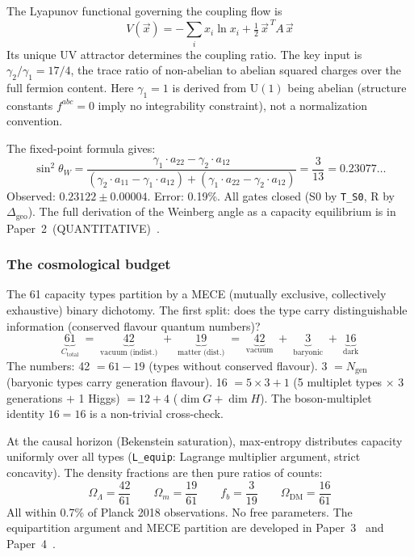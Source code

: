 \documentclass[11pt]{article}
\newcommand{\U}{\mathrm{U}}
\begin{document}
The Lyapunov functional governing the coupling flow is
\begin{equation}
V(\vec{x}) = -\sum_i x_i \ln x_i + \tfrac{1}{2}\, \vec{x}^{\,T} A\, \vec{x}
\end{equation}
Its unique UV attractor determines the coupling ratio.  The key input is $\gamma_2/\gamma_1 = 17/4$, the trace ratio of non-abelian to abelian squared charges over the full fermion content.  Here $\gamma_1 = 1$ is derived from $\U(1)$ being abelian (structure constants $f^{abc} = 0$ imply no integrability constraint), not a normalization convention.

The fixed-point formula gives:
\begin{equation}
\sin^2\!\theta_W = \frac{\gamma_1 \cdot a_{22} - \gamma_2 \cdot a_{12}}{(\gamma_2 \cdot a_{11} - \gamma_1 \cdot a_{12}) + (\gamma_1 \cdot a_{22} - \gamma_2 \cdot a_{12})} = \frac{3}{13} = 0.23077\ldots
\end{equation}
Observed: $0.23122 \pm 0.00004$.  Error: 0.19\%.  All gates closed (S0 by \texttt{T\_S0}, R by $\Delta_{\mathrm{geo}}$).  The full derivation of the Weinberg angle as a capacity equilibrium is in Paper~2~(QUANTITATIVE)~\cite{P2Q}.


\subsubsection{The cosmological budget}

The 61 capacity types partition by a MECE (mutually exclusive, collectively exhaustive) binary dichotomy.  The first split: does the type carry distinguishable information (conserved flavour quantum numbers)?
\begin{equation}
\underbrace{61}_{C_{\mathrm{total}}} \;=\; \underbrace{42}_{\text{vacuum (indist.)}} \;+\; \underbrace{19}_{\text{matter (dist.)}} \;=\; \underbrace{42}_{\text{vacuum}} \;+\; \underbrace{3}_{\text{baryonic}} \;+\; \underbrace{16}_{\text{dark}}
\end{equation}
The numbers: 42 $= 61 - 19$ (types without conserved flavour).  3 $= N_{\mathrm{gen}}$ (baryonic types carry generation flavour).  16 $= 5\times 3 + 1$ (5 multiplet types $\times$ 3 generations $+$ 1 Higgs) $= 12 + 4$ ($\dim G + \dim H$).  The boson-multiplet identity $16 = 16$ is a non-trivial cross-check.

At the causal horizon (Bekenstein saturation), max-entropy distributes capacity uniformly over all types (\texttt{L\_equip}: Lagrange multiplier argument, strict concavity).  The density fractions are then pure ratios of counts:
\begin{equation}
\Omega_\Lambda = \frac{42}{61} \qquad \Omega_m = \frac{19}{61} \qquad f_b = \frac{3}{19} \qquad \Omega_{\mathrm{DM}} = \frac{16}{61}
\end{equation}
All within 0.7\% of Planck 2018 observations.  No free parameters.  The equipartition argument and MECE partition are developed in Paper~3~\cite{P3} and Paper~4~\cite{P4}.
\end{document}

